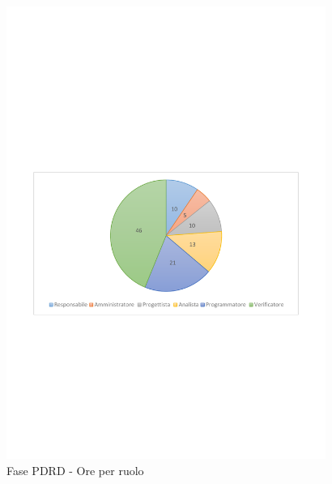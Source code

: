 \documentclass[../PianoProgetto.tex]{subfiles}
\begin{document}
	\begin{figure}[!h]
		\centering
		\includegraphics[width=0.93\textwidth , trim=2cm 9.5cm 2cm 11cm]{grafici/PDRD/PDRD-ore-ruolo}
			\caption{Fase PDRD - Ore per ruolo}
		\label{fig:CircleChart-fasePDRD_ore_r}
	\end{figure}
\vfill	
\newpage
\vfill
\end{document}
